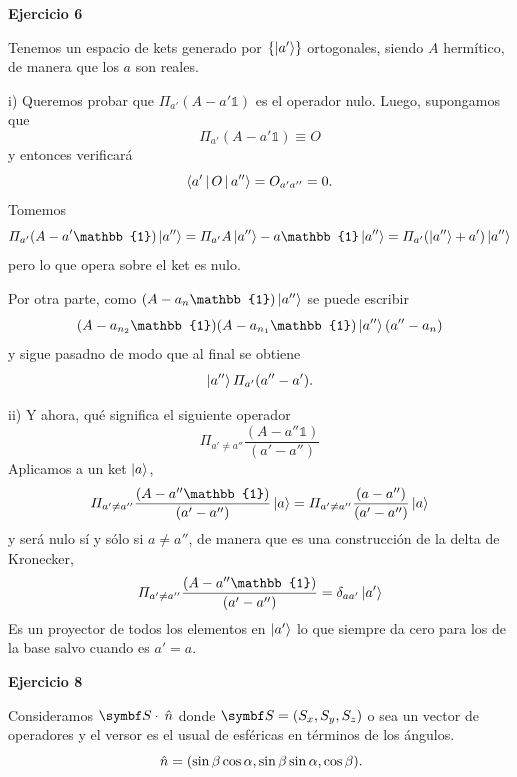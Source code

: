 \documentclass[10pt,oneside]{CBFT_book}
\begin{document}
\begin{ejemplo}{\bf Ejercicio 6}
 
Tenemos un espacio de kets generado por $\{ \Ket{a'} \}$ ortogonales, siendo $A$ hermítico, de
manera que los $a$ son reales.

i) Queremos probar que $\Pi_{a'} (A - a'\mathbb{1})$ es el operador nulo. Luego, supongamos que 
\[
	\Pi_{a'} (A-a'\mathbb{1}) \equiv O
\]
y entonces verificará
\[
	\Braket{a'|O|a''} = O_{a'a''} = 0.
\]
Tomemos
\[
	\Pi_{a'} (A-a'\mathbb{1}) \Ket{a''} = \Pi_{a'} A \Ket{a''} - a\mathbb{1} \Ket{a''}
	= \Pi_{a'} (\Ket{a''} + a' ) \Ket{a''}
\]
pero lo que opera sobre el ket es nulo.

Por otra parte, como $(A-a_n\mathbb{1})\Ket{a''}$ se puede escribir
\[
	(A-a_{n_2}\mathbb{1})(A-a_{n_1}\mathbb{1})\Ket{a''}( a'' - a_n )
\]
y sigue pasadno de modo que al final se obtiene
\[
	\Ket{a''} \Pi_{a'} (a'' - a').
\]

ii) Y ahora, qué significa el siguiente operador
\[
	\Pi_{a' \neq a''} \frac{ (A-a''\mathbb{1}) }{ ( a' - a'' ) }
\]
Aplicamos a un ket $\Ket{a}$,
\[
	\Pi_{a' \neq a''} \frac{ (A-a''\mathbb{1}) }{ ( a' - a'' ) } \Ket{a} = 
	\Pi_{a' \neq a''} \frac{ ( a - a'' ) }{ ( a' - a'' ) } \Ket{a}
\]
y será nulo sí y sólo si $a \neq a''$, de manera que es una construcción de la delta de Kronecker,
\[
	\Pi_{a' \neq a''} \frac{ (A-a''\mathbb{1}) }{ ( a' - a'' ) } = \delta_{aa'}\Ket{a'}
\]
Es un proyector de todos los elementos en $\Ket{a'}$ lo que siempre da cero para los de la base
salvo cuando es $a'=a$.
 
\end{ejemplo}

\begin{ejemplo}{\bf Ejercicio 8}

Consideramos $\vb S\cdot \nver$ donde $\vb S = ( S_x, S_y, S_z )$ o sea un vector de operadores y el
versor es el usual de esféricas en términos de los ángulos.
\[
	\:\hat{n} = (\sin\beta\cos\alpha, \sin\beta\sin\alpha, \cos\beta).
\]
\end{ejemplo}
\end{document}
